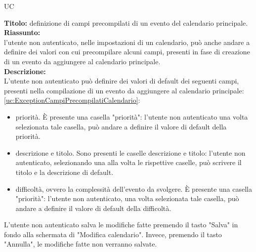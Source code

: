 \begin{listaPersonale}{UC}
\begin{listaPersonale2}[UC] {}
            \textbf{Titolo: } definizione di campi precompilati di un evento del calendario principale. \\
            \textbf{Riassunto: } \\ l'utente non autenticato, nelle impostazioni di un calendario, può anche andare a definire dei valori con cui precompilare alcuni campi, presenti in fase di creazione di un evento da aggiungere al calendario principale. \\
            \textbf{Descrizione: } \\
            L'utente non autenticato può definire dei valori di default dei seguenti campi, presenti nella compilazione di un evento da aggiungere al calendario principale: \ref{uc:ExceptionCampiPrecompilatiCalendario}:
            \begin{itemize}
                \item priorità. È presente una casella "priorità": l'utente non autenticato una volta selezionata tale casella, può andare a definire il valore di default della priorità.
                \item descrizione e titolo. Sono presenti le caselle descrizione e titolo: l'utente non autenticato, selezionando una alla volta le rispettive caselle, può scrivere il titolo e la descrizione di default.
                \item difficoltà, ovvero la complessità dell'evento da svolgere. È presente una casella "priorità": l'utente non autenticato, una volta selezionata tale casella, può andare a definire il valore di default della difficoltà.
            \end{itemize}
            L'utente non autenticato salva le modifiche fatte premendo il tasto "Salva" in fondo alla schermata di "Modifica calendario". Invece, premendo il tasto "Annulla", le modifiche fatte non verranno salvate.


\end{listaPersonale2}
\end{listaPersonale}
